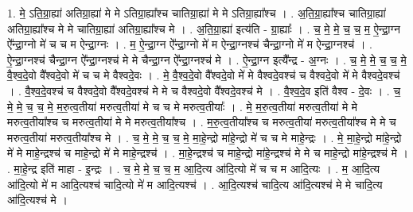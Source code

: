 \documentclass[17pt]{extarticle}
\begin{document}
1. मे॒ ऽति॒ग्रा॒ह्या॑ अतिग्रा॒ह्या॑ मे मे ऽतिग्रा॒ह्या᳚श्च चातिग्रा॒ह्या॑ मे मे ऽतिग्रा॒ह्या᳚श्च । . अ॒ति॒ग्रा॒ह्या᳚श्च चातिग्रा॒ह्या॑ अतिग्रा॒ह्या᳚श्च मे मे चातिग्रा॒ह्या॑ अतिग्रा॒ह्या᳚श्च मे । . अ॒ति॒ग्रा॒ह्या॑ इत्य॑ति - ग्रा॒ह्याः᳚ । . च॒ मे॒ मे॒ च॒ च॒ म॒ ऐ॒न्द्रा॒ग्न ऐ᳚न्द्रा॒ग्नो मे॑ च च म ऐन्द्रा॒ग्नः । . म॒ ऐ॒न्द्रा॒ग्न ऐ᳚न्द्रा॒ग्नो मे॑ म ऐन्द्रा॒ग्नश्च॑ चैन्द्रा॒ग्नो मे॑ म ऐन्द्रा॒ग्नश्च॑ । . ऐ॒न्द्रा॒ग्नश्च॑ चैन्द्रा॒ग्न ऐ᳚न्द्रा॒ग्नश्च॑ मे मे चैन्द्रा॒ग्न ऐ᳚न्द्रा॒ग्नश्च॑ मे । . ऐ॒न्द्रा॒ग्न इत्यै᳚न्द्र - अ॒ग्नः । . च॒ मे॒ मे॒ च॒ च॒ मे॒ वै॒श्व॒दे॒वो वै᳚श्वदे॒वो मे॑ च च मे वैश्वदे॒वः । . मे॒ वै॒श्व॒दे॒वो वै᳚श्वदे॒वो मे॑ मे वैश्वदे॒वश्च॑ च वैश्वदे॒वो मे॑ मे वैश्वदे॒वश्च॑ । . वै॒श्व॒दे॒वश्च॑ च वैश्वदे॒वो वै᳚श्वदे॒वश्च॑ मे मे च वैश्वदे॒वो वै᳚श्वदे॒वश्च॑ मे । . वै॒श्व॒दे॒व इति॑ वैश्व - दे॒वः । . च॒ मे॒ मे॒ च॒ च॒ मे॒ म॒रु॒त्व॒तीया॑ मरुत्व॒तीया॑ मे च च मे मरुत्व॒तीयाः᳚ । . मे॒ म॒रु॒त्व॒तीया॑ मरुत्व॒तीया॑ मे मे मरुत्व॒तीया᳚श्च च मरुत्व॒तीया॑ मे मे मरुत्व॒तीया᳚श्च । . म॒रु॒त्व॒तीया᳚श्च च मरुत्व॒तीया॑ मरुत्व॒तीया᳚श्च मे मे च मरुत्व॒तीया॑ मरुत्व॒तीया᳚श्च मे । . च॒ मे॒ मे॒ च॒ च॒ मे॒ मा॒हे॒न्द्रो मा॑हे॒न्द्रो मे॑ च च मे माहे॒न्द्रः । . मे॒ मा॒हे॒न्द्रो मा॑हे॒न्द्रो मे॑ मे माहे॒न्द्रश्च॑ च माहे॒न्द्रो मे॑ मे माहे॒न्द्रश्च॑ । . मा॒हे॒न्द्रश्च॑ च माहे॒न्द्रो मा॑हे॒न्द्रश्च॑ मे मे च माहे॒न्द्रो मा॑हे॒न्द्रश्च॑ मे । . मा॒हे॒न्द्र इति॑ माहा - इ॒न्द्रः । . च॒ मे॒ मे॒ च॒ च॒ म॒ आ॒दि॒त्य आ॑दि॒त्यो मे॑ च च म आदि॒त्यः । . म॒ आ॒दि॒त्य आ॑दि॒त्यो मे॑ म आदि॒त्यश्च॑ चादि॒त्यो मे॑ म आदि॒त्यश्च॑ । . आ॒दि॒त्यश्च॑ चादि॒त्य आ॑दि॒त्यश्च॑ मे मे चादि॒त्य आ॑दि॒त्यश्च॑ मे । \newline
\end{document}

